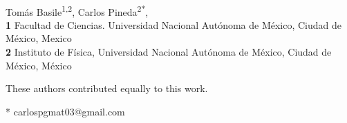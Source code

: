 \documentclass[10pt,letterpaper]{article} %
\begin{document}
\vspace*{0.2in}

\begin{flushleft}
{\Large
\textbf{} %
}
\newline
\\
Tomás Basile\textsuperscript{1,2\Yinyang},
Carlos Pineda\textsuperscript{2*\Yinyang},
\\
\bigskip
\textbf{1} Facultad de Ciencias. Universidad Nacional Autónoma de México, Ciudad de México, Mexico
\\
\textbf{2} Instituto de Física, Universidad Nacional Autónoma de México, Ciudad de México, México
\\
\bigskip

% 
%
\Yinyang These authors contributed equally to this work.





* carlospgmat03@gmail.com

\end{flushleft}
\end{document}
